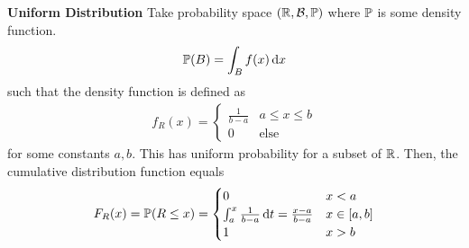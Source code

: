 \begin{example}
    \textbf{Uniform Distribution}
    Take probability space $(\mathbb{R}, \mathcal{B}, \mathbb{P})$ where $\mathbb{P}$ is some density function.
    \begin{align}
        \mathbb{P}(B) = \int_B f(x) \dd{x}
    \end{align}
    such that the density function is defined as
    \begin{align}
        f_R(x) = \begin{cases}
            \frac{1}{b-a} & a \le x \le b\\
            0 & \text{else}
        \end{cases}
    \end{align}
    for some constants $a,b$. This has uniform probability for a subset of $\mathbb{R}$. Then, the cumulative distribution function equals
    \begin{align}
        F_R(x) = \mathbb{P}(R \le x) = \begin{cases}
            0 & x < a\\
            \int_a^{x} \frac{1}{b-a} \dd{t} = \frac{x-a}{b-a} & x \in [a,b]\\
            1 & x > b
        \end{cases}
    \end{align}
\end{example}



